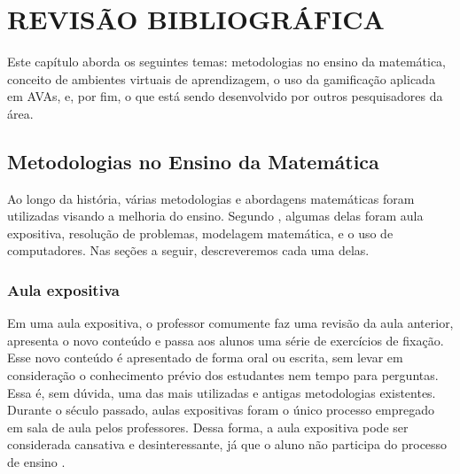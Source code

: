 \section{REVISÃO BIBLIOGRÁFICA}

Este capítulo aborda os seguintes temas: metodologias no ensino da matemática, conceito de ambientes virtuais de aprendizagem, o uso da gamificação aplicada em AVAs, e, por fim, o que está sendo 
desenvolvido por outros pesquisadores da área.

\subsection{Metodologias no Ensino da Matemática}

Ao longo da história, várias metodologias e abordagens matemáticas foram utilizadas visando a melhoria do ensino. Segundo , algumas delas foram aula expositiva, 
resolução de problemas, modelagem matemática, e o uso de computadores. Nas seções a seguir, descreveremos cada uma delas.

\subsubsection{Aula expositiva}

Em uma aula expositiva, o professor comumente faz uma revisão da aula anterior, apresenta o novo conteúdo e passa aos alunos uma série de exercícios de fixação. Esse novo conteúdo é apresentado de 
forma oral ou escrita, sem levar em consideração o conhecimento prévio dos estudantes nem tempo para perguntas. Essa é, sem dúvida, uma das mais utilizadas e antigas metodologias existentes. Durante 
o século passado, aulas expositivas foram o único processo empregado em sala de aula pelos professores. Dessa forma, a aula expositiva pode ser considerada cansativa e desinteressante, já que o aluno 
não participa do processo de ensino  \cite{hammes2003tendencias}.

